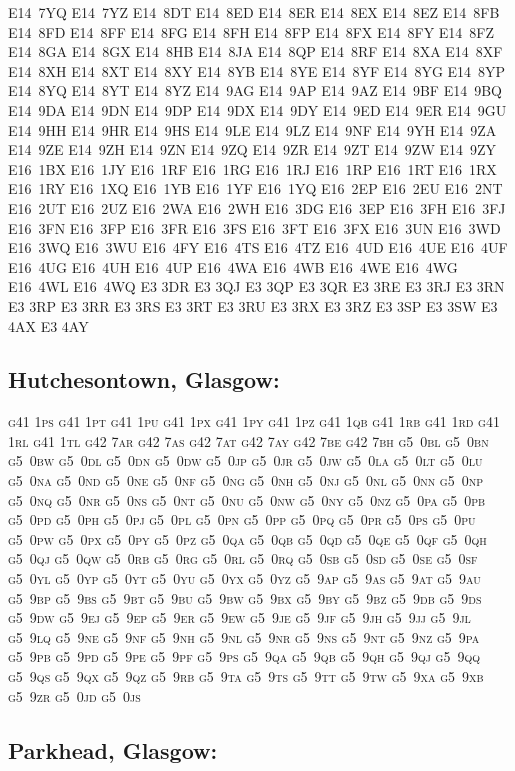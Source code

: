 \documentclass[12pt,a4paper]{article}
\begin{document}
{{E14~7YQ	E14~7YZ	E14~8DT	E14~8ED	E14~8ER	E14~8EX
E14~8EZ	E14~8FB	E14~8FD	E14~8FF	E14~8FG	E14~8FH
E14~8FP	E14~8FX	E14~8FY	E14~8FZ	E14~8GA	E14~8GX
E14~8HB	E14~8JA	E14~8QP	E14~8RF	E14~8XA	E14~8XF
E14~8XH	E14~8XT	E14~8XY	E14~8YB	E14~8YE	E14~8YF
E14~8YG	E14~8YP	E14~8YQ	E14~8YT	E14~8YZ	E14~9AG
E14~9AP	E14~9AZ	E14~9BF	E14~9BQ	E14~9DA	E14~9DN
E14~9DP	E14~9DX	E14~9DY	E14~9ED	E14~9ER	E14~9GU
E14~9HH	E14~9HR	E14~9HS	E14~9LE	E14~9LZ	E14~9NF
E14~9YH	E14~9ZA	E14~9ZE	E14~9ZH	E14~9ZN	E14~9ZQ
E14~9ZR	E14~9ZT	E14~9ZW	E14~9ZY	E16~1BX	E16~1JY
E16~1RF	E16~1RG	E16~1RJ	E16~1RP	E16~1RT	E16~1RX
E16~1RY	E16~1XQ	E16~1YB	E16~1YF	E16~1YQ	E16~2EP
E16~2EU	E16~2NT	E16~2UT	E16~2UZ	E16~2WA	E16~2WH
E16~3DG	E16~3EP	E16~3FH	E16~3FJ	E16~3FN	E16~3FP
E16~3FR	E16~3FS	E16~3FT	E16~3FX	E16~3UN	E16~3WD
E16~3WQ	E16~3WU	E16~4FY	E16~4TS	E16~4TZ	E16~4UD
E16~4UE	E16~4UF	E16~4UG	E16~4UH	E16~4UP	E16~4WA
E16~4WB	E16~4WE	E16~4WG	E16~4WL	E16~4WQ	E3 3DR
E3 3QJ	E3 3QP	E3 3QR	E3 3RE	E3 3RJ	E3 3RN
E3 3RP	E3 3RR	E3 3RS	E3 3RT	E3 3RU	E3 3RX
E3 3RZ	E3 3SP	E3 3SW	E3 4AX	E3 4AY	
}}

\subsection*{Hutchesontown, Glasgow:}

\textsc{\lowercase{%
G41 1PS	G41 1PT	G41 1PU	G41 1PX	G41 1PY	G41 1PZ
G41 1QB	G41 1RB	G41 1RD	G41 1RL	G41 1TL	G42 7AR
G42 7AS	G42 7AT	G42 7AY	G42 7BE	G42 7BH	G5~0BL
G5~0BN	G5~0BW	G5~0DL	G5~0DN	G5~0DW	G5~0JP
G5~0JR	G5~0JW	G5~0LA	G5~0LT	G5~0LU	G5~0NA
G5~0ND	G5~0NE	G5~0NF	G5~0NG	G5~0NH	G5~0NJ
G5~0NL	G5~0NN	G5~0NP	G5~0NQ	G5~0NR	G5~0NS
G5~0NT	G5~0NU	G5~0NW	G5~0NY	G5~0NZ	G5~0PA
G5~0PB	G5~0PD	G5~0PH	G5~0PJ	G5~0PL	G5~0PN
G5~0PP	G5~0PQ	G5~0PR	G5~0PS	G5~0PU	G5~0PW
G5~0PX	G5~0PY	G5~0PZ	G5~0QA	G5~0QB	G5~0QD
G5~0QE	G5~0QF	G5~0QH	G5~0QJ	G5~0QW	G5~0RB
G5~0RG	G5~0RL	G5~0RQ	G5~0SB	G5~0SD	G5~0SE
G5~0SF	G5~0YL	G5~0YP	G5~0YT	G5~0YU	G5~0YX
G5~0YZ	G5~9AP	G5~9AS	G5~9AT	G5~9AU	G5~9BP
G5~9BS	G5~9BT	G5~9BU	G5~9BW	G5~9BX	G5~9BY
G5~9BZ	G5~9DB	G5~9DS	G5~9DW	G5~9EJ	G5~9EP
G5~9ER	G5~9EW	G5~9JE	G5~9JF	G5~9JH	G5~9JJ
G5~9JL	G5~9LQ	G5~9NE	G5~9NF	G5~9NH	G5~9NL
G5~9NR	G5~9NS	G5~9NT	G5~9NZ	G5~9PA	G5~9PB
G5~9PD	G5~9PE	G5~9PF	G5~9PS	G5~9QA	G5~9QB
G5~9QH	G5~9QJ	G5~9QQ	G5~9QS	G5~9QX	G5~9QZ
G5~9RB	G5~9TA	G5~9TS	G5~9TT	G5~9TW	G5~9XA
G5~9XB	G5~9ZR	G5~0JD	G5~0JS		
}}

\subsection*{Parkhead, Glasgow:}
\end{document}
